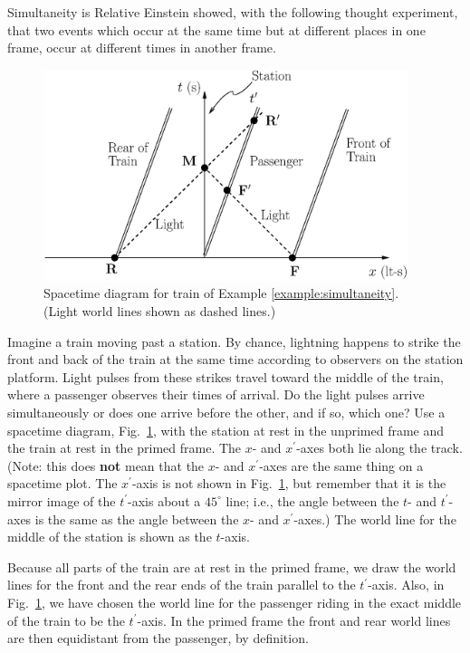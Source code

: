 \begin{example}{Simultaneity is Relative}  
Einstein showed, with the following thought experiment, that two events
which occur at the same time but at different places in one frame,
occur at different times in another frame.

\begin{figure}[tbp]
\begin{center}
\includegraphics[width=4.2in]{relativistic_spacetime/worldlines4.eps}
\end{center}
\caption{Spacetime diagram for train of Example 
\ref{example:simultaneity}. (Light
world lines shown as dashed lines.)}
\label{fig:simultaneity}
\end{figure}

Imagine a train moving past a station.  By chance, lightning
happens to strike the front and back of the train at the same time
according to observers on the station platform.  Light pulses from
these strikes travel toward the middle of the train, where a passenger
observes their times of arrival.  Do the light pulses arrive
simultaneously or does one arrive before the other, and if so, which
one?
\solution
Use a spacetime diagram, Fig.~\ref{fig:simultaneity}, with the
station at rest in the unprimed frame and the train at rest in the
primed frame.  The $x$- and $x^\prime$-axes both lie along the track.
(Note:  this does {\bf not} mean that the $x$- and $x^\prime$-axes
are the same thing on a spacetime plot.  The $x^\prime$-axis is not
shown in Fig.~\ref{fig:simultaneity}, but remember that it is the mirror
image of the $t^\prime$-axis about a $45^\circ$ line; i.e., the angle
between the $t$- and $t^\prime$-axes is the same as the angle between
the $x$- and $x^\prime$-axes.)
The world line for the middle of the station is shown as the $t$-axis.

Because all parts of the train are at rest in the primed frame, we
draw the world lines for the front and the rear ends of the train
parallel to the $t^\prime$-axis.  Also, in
Fig.~\ref{fig:simultaneity}, we have chosen the world line for the
passenger riding in the exact middle of the train to be the
$t^\prime$-axis.  In the primed frame the front and rear world lines
are then equidistant from the passenger, by definition.


\end{example}
